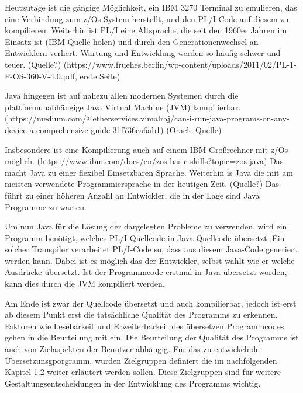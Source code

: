Heutzutage ist die gängige Möglichkeit, ein IBM 3270 Terminal zu emulieren, das eine Verbindung zum z/Os System herstellt, und den PL/I Code auf diesem zu kompilieren.
Weiterhin ist PL/I eine Altsprache, die seit den 1960er Jahren im Einsatz ist (IBM Quelle holen) und durch den Generationenwechsel an Entwicklern verliert. Wartung und Entwicklung werden so häufig schwer und teuer. (Quelle?)
(https://www.fruehes.berlin/wp-content/uploads/2011/02/PL-1-F-OS-360-V-4.0.pdf, erste Seite)

Java hingegen ist auf nahezu allen modernen Systemen durch die plattformunabhängige Java Virtual Machine (JVM) kompilierbar. 
(https://medium.com/@etherservices.vimalraj/can-i-run-java-programs-on-any-device-a-comprehensive-guide-31f736ca6ab1) (Oracle Quelle)

Insbesondere ist eine Kompilierung auch auf einem IBM-Großrechner mit z/Os möglich. (https://www.ibm.com/docs/en/zos-basic-skills?topic=zos-java)
Das macht Java zu einer flexibel Einsetzbaren Sprache. Weiterhin is Java die mit am meisten verwendete Programmiersprache in der heutigen Zeit. (Quelle?) Das führt zu einer höheren Anzahl an Entwickler, die in der Lage sind Java Programme zu warten.

Um nun Java für die Lösung der dargelegten Probleme zu verwenden, wird ein Programm benötigt, welches PL/I Quellcode in Java Quellcode übersetzt. Ein solcher Transpiler verarbeitet PL/I-Code so, dass aus diesem Java-Code generiert werden kann. Dabei ist es möglich das der Entwickler, selbst wählt wie er welche Ausdrücke übersetzt. Ist der Programmcode erstmal in Java übersetzt worden, kann dies durch die JVM kompiliert werden.

Am Ende ist zwar der Quellcode übersetzt und auch kompilierbar, jedoch ist erst ab diesem Punkt erst die tatsächliche Qualität des Programms zu erkennen. Faktoren wie Lesebarkeit und Erweiterbarkeit des übersetzen Programmcodes gehen in die Beurteilung mit ein. 
Die Beurteilung der Qualität des Programms ist auch von Zielaspekten der Benutzer abhängig. Für das zu entwickelnde Übersetzunsgporgramm, wurden Zielgruppen definiert die im nachfolgenden Kapitel 1.2 weiter erläutert werden sollen. Diese Zielgruppen sind für weitere Gestaltungsentscheidungen in der Entwicklung des Programms wichtig.

\pagebreak
     
